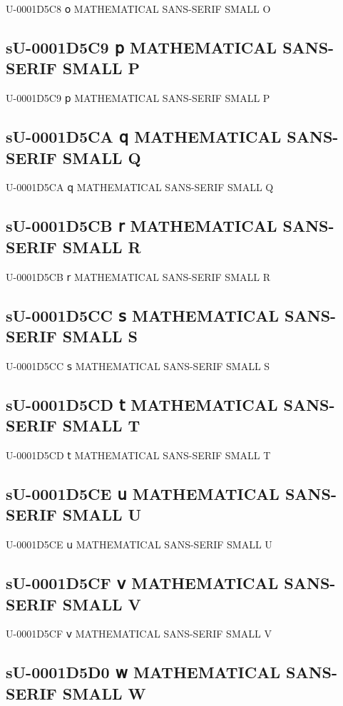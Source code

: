 U-0001D5C8 𝗈 MATHEMATICAL SANS-SERIF SMALL O

\subsection{sU-0001D5C9 𝗉 MATHEMATICAL SANS-SERIF SMALL P}

U-0001D5C9 𝗉 MATHEMATICAL SANS-SERIF SMALL P

\subsection{sU-0001D5CA 𝗊 MATHEMATICAL SANS-SERIF SMALL Q}

U-0001D5CA 𝗊 MATHEMATICAL SANS-SERIF SMALL Q

\subsection{sU-0001D5CB 𝗋 MATHEMATICAL SANS-SERIF SMALL R}

U-0001D5CB 𝗋 MATHEMATICAL SANS-SERIF SMALL R

\subsection{sU-0001D5CC 𝗌 MATHEMATICAL SANS-SERIF SMALL S}

U-0001D5CC 𝗌 MATHEMATICAL SANS-SERIF SMALL S

\subsection{sU-0001D5CD 𝗍 MATHEMATICAL SANS-SERIF SMALL T}

U-0001D5CD 𝗍 MATHEMATICAL SANS-SERIF SMALL T

\subsection{sU-0001D5CE 𝗎 MATHEMATICAL SANS-SERIF SMALL U}

U-0001D5CE 𝗎 MATHEMATICAL SANS-SERIF SMALL U

\subsection{sU-0001D5CF 𝗏 MATHEMATICAL SANS-SERIF SMALL V}

U-0001D5CF 𝗏 MATHEMATICAL SANS-SERIF SMALL V

\subsection{sU-0001D5D0 𝗐 MATHEMATICAL SANS-SERIF SMALL W}

